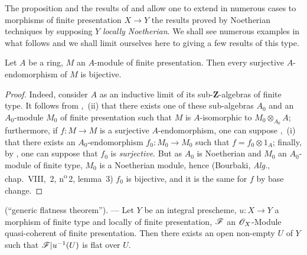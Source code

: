 \begin{env}[8.9.2]
\label{IV.8.9.2}
The proposition  and the results of  and  allow one to extend in numerous cases to morphisms of finite presentation $X\to Y$ the results proved by Noetherian techniques by supposing $Y$ \emph{locally Noetherian}.
We shall see numerous examples in what follows and we shall limit ourselves here to giving a few results of this type.
\end{env}

\begin{proposition}[8.9.3]
\label{IV.8.9.3}
Let $A$ be a ring, $M$ an $A$-module of finite presentation.
Then every surjective $A$-endomorphism of $M$ is bijective.
\end{proposition}

\begin{proof}
Indeed, consider $A$ as an inductive limit of its sub-$\mathbf{Z}$-algebras of finite type.
It follows from ,~(ii) that there exists one of these sub-algebras $A_0$ and an $A_0$-module $M_0$ of finite presentation such that $M$ is $A$-isomorphic to $M_0\otimes_{A_0}A$; furthermore, if $f:M\to M$ is a surjective $A$-endomorphism, one can suppose ,~(i) that there exists an $A_0$-endomorphism $f_0:M_0\to M_0$ such that $f=f_0\otimes 1_A$; finally, by , one can suppose that $f_0$ is \emph{surjective}.
But as $A_0$ is Noetherian and $M_0$ an $A_0$-module of finite type, $M_0$ is a Noetherian module, hence (Bourbaki, \emph{Alg.}, chap.~VIII, \textsection\,2, n\textsuperscript{o}\,2, lemma~3) $f_0$ is bijective, and it is the same for $f$ by base change.
\end{proof}

\begin{proposition}[8.9.4]
\label{IV.8.9.4}
(``generic flatness theorem''). --- Let $Y$ be an integral prescheme, $u:X\to Y$ a morphism of finite type and locally of finite presentation, $\mathscr{F}$ an $\mathscr{O}_X$-Module quasi-coherent of finite presentation.
Then there exists an open non-empty $U$ of $Y$ such that $\mathscr{F}|u^{-1}(U)$ is flat over $U$.
\end{proposition}

